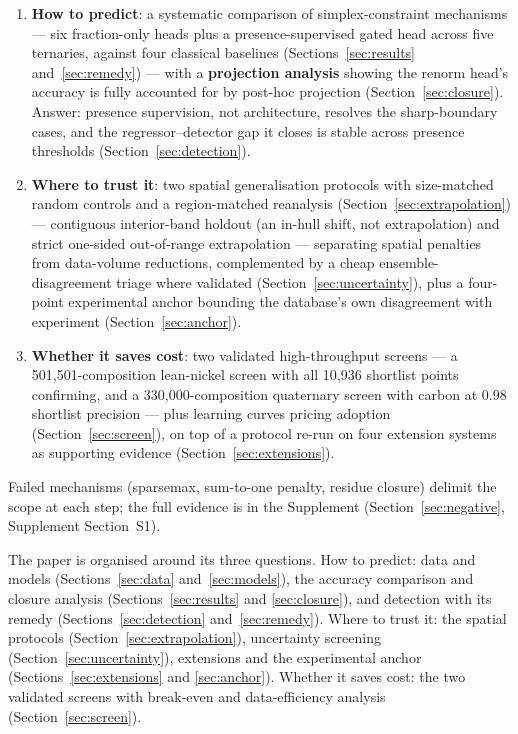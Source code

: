 \documentclass[preprint,12pt,authoryear]{elsarticle}
\begin{document}
\begin{enumerate}
\item \textbf{How to predict}: a systematic comparison of simplex-constraint
mechanisms --- six fraction-only heads plus a presence-supervised gated
head across five ternaries, against four classical baselines
(Sections~\ref{sec:results} and~\ref{sec:remedy}) --- with a
\textbf{projection analysis} showing the renorm head's accuracy is fully
accounted for by post-hoc projection (Section~\ref{sec:closure}). Answer:
presence supervision, not architecture, resolves the sharp-boundary
cases, and the regressor--detector gap it closes is stable across
presence thresholds (Section~\ref{sec:detection}).
\item \textbf{Where to trust it}: two spatial generalisation protocols with
size-matched random controls and a region-matched reanalysis
(Section~\ref{sec:extrapolation}) --- contiguous interior-band holdout
(an in-hull shift, not extrapolation) and strict one-sided out-of-range
extrapolation --- separating spatial penalties from data-volume
reductions, complemented by a cheap ensemble-disagreement triage where
validated (Section~\ref{sec:uncertainty}), plus a four-point
experimental anchor bounding the database's own disagreement with
experiment (Section~\ref{sec:anchor}).
\item \textbf{Whether it saves cost}: two validated high-throughput
screens --- a 501{,}501-composition lean-nickel screen with all 10{,}936
shortlist points confirming, and a 330{,}000-composition quaternary
screen with carbon at 0.98 shortlist precision --- plus learning curves
pricing adoption (Section~\ref{sec:screen}), on top of a protocol
re-run on four extension systems as supporting evidence
(Section~\ref{sec:extensions}).
\end{enumerate}
Failed mechanisms (sparsemax, sum-to-one penalty, residue closure)
delimit the scope at each step; the full evidence is in the Supplement
(Section~\ref{sec:negative}, Supplement Section~S1).

The paper is organised around its three questions. How to predict:
data and models (Sections~\ref{sec:data} and~\ref{sec:models}), the
accuracy comparison and closure analysis (Sections~\ref{sec:results} and
\ref{sec:closure}), and detection with its remedy
(Sections~\ref{sec:detection} and~\ref{sec:remedy}). Where to trust it:
the spatial protocols (Section~\ref{sec:extrapolation}), uncertainty
screening (Section~\ref{sec:uncertainty}), extensions and the
experimental anchor (Sections~\ref{sec:extensions} and
\ref{sec:anchor}). Whether it saves cost: the two validated screens with
break-even and data-efficiency analysis (Section~\ref{sec:screen}).
\end{document}
